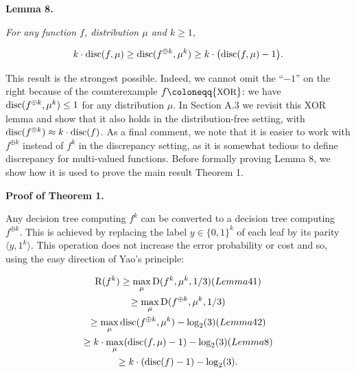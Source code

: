 

\par\medskip\noindent\textbf{
\textbf{Lemma 8}\textbf{.}
}\par



\emph{For any function $f$, distribution $\mu$ and $k\geq 1$,}\par


\[\begin{gathered}
k\cdot{\textup{disc}}(f,\mu)\geq{\textup{disc}}(f^{\oplus k},\mu^{k})\geq k\cdot\big{(}{\textup{disc}}(f,\mu)-1\big{)}.
\end{gathered}\]






This result is the strongest possible. Indeed, we cannot omit the “$-1$” on the right because of the counterexample $f\coloneqq{\textrm{\small{XOR}}}$: we have ${\textup{disc}}(f^{\oplus k},\mu^{k})\leq 1$ for any distribution $\mu$. In Section A.3 we revisit this XOR lemma and show that it also holds in the distribution-free setting, with ${\textup{disc}}(f^{\oplus k})\approx k\cdot{\textup{disc}}(f)$. As a final comment, we note that it is easier to work with $f^{\oplus k}$ instead of $f^{k}$ in the discrepancy setting, as it is somewhat tedious to define discrepancy for multi-valued functions. Before formally proving Lemma 8, we show how it is used to prove the main result Theorem 1.\par




\par\medskip\noindent\textbf{Proof of Theorem 1.}\par




Any decision tree computing $f^{k}$ can be converted to a decision tree computing $f^{\oplus k}$. This is achieved by replacing the label $y\in\{0,1\}^{k}$ of each leaf by its parity $\langle y,1^{k}\rangle$. This operation does not increase the error probability or cost and so, using the easy direction of Yao’s principle:\par


\[\begin{gathered}
\displaystyle{\textup{R}}(f^{k}) \displaystyle\geq\max_{\mu}{\textup{D}}(f^{k},\mu^{k},1/3) (Lemma 41) \\
\displaystyle\geq\max_{\mu}{\textup{D}}(f^{\oplus k},\mu^{k},1/3) \\
\displaystyle\geq\max_{\mu}{\textup{disc}}(f^{\oplus k},\mu^{k})-\log_{2}(3) (Lemma 42) \\
\displaystyle\geq k\cdot\max_{\mu}({\textup{disc}}(f,\mu)-1)-\log_{2}(3) (Lemma 8) \\
\displaystyle\geq k\cdot({\textup{disc}}(f)-1)-\log_{2}(3).
\end{gathered}\]



